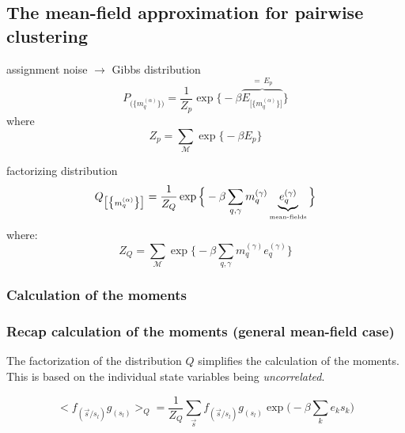 \subsection{The mean-field approximation for pairwise clustering}

\begin{frame}[t] 
\slidesonly{\frametitle{\subsecname}}

\svspace{-3mm}

\begin{block}{assignment noise $\rightarrow$ Gibbs distribution}
\begin{equation}
	P_{ \big( \big\{ m_q^{(\alpha)} \big\} \big) }
	= \frac{1}{Z_p} \exp \Big\{ -\beta 
	\overbrace{
		E_{\big[ \big\{ m_q^{(\alpha)} \big\} \big]}
		}^{= \, E_p}
		\Big\}
\end{equation}
where
\begin{equation}
	Z_p = \sum\limits_{\mathscr{M}} \exp \Big\{ -\beta
		E_p
		\Big\}
\end{equation}
\end{block}
\begin{block}{factorizing distribution}
\begin{equation}
	Q_{ \big[ \big\{ m_q^{(\alpha)} \big\} \big] }
	= \frac{1}{Z_Q} \exp \Big\{ -\beta \sum\limits_{q, \gamma}
		m_q^{(\gamma)} \underbrace{ e_q^{(\gamma)} }_{
			\text{{\tiny mean-fields}} } \Big\}
\end{equation}
where:
\begin{equation}
	Z_Q = \sum\limits_{\mathscr{M}} \exp \Big\{ -\beta \sum\limits_{q, 
		\gamma} m_q^{(\gamma)} e_q^{(\gamma)} \Big\}
\end{equation}
\end{block}
\end{frame}

\subsubsection{Calculation of the moments}

\begin{frame}\frametitle{Recap calculation of the moments (general mean-field case)}
The factorization of the distribution $Q$ simplifies the calculation of the moments. 
This is based on the individual state variables being \emph{uncorrelated}.

\begin{equation}\label{eq:factorizingMoments}
	\Big< f_{(\vec{s}/s_l)} g_{(s_l)} \Big>_Q
	 = \frac{1}{Z_Q} \sum\limits_{\vec{s}} f_{(\vec{s}/s_l)}
		g_{(s_l)} \exp \Big( -\beta \sum\limits_k e_k s_k \Big)
\end{equation}

\end{frame}

